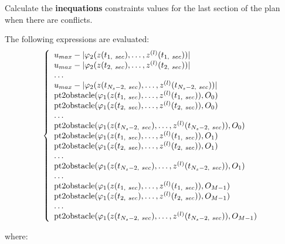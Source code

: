 \documentclass[letterpaper,10pt,english]{sphinxmanual}
\begin{document}
\begin{fulllineitems}
\begin{fulllineitems}
\end{fulllineitems}


\begin{fulllineitems}
\label{Multi-robot motion planner:planning_sim.Robot._ls_co_fieqcons}
Calculate the \textbf{inequations} constraints values for the last section of the plan when
there are conflicts.

The following expressions are evaluated:
\begin{gather}
\begin{split}\left\lbrace\begin{array}{lcl}
u_{max} - |\varphi_2(z(t_{1,\ sec}),\dotsc,z^{(l)}(t_{1,\ sec}))|\\
u_{max} - |\varphi_2(z(t_{2,\ sec}),\dotsc,z^{(l)}(t_{2,\ sec}))|\\
\dotsc\\
u_{max} - |\varphi_2(z(t_{N_s-2,\ sec}),\dotsc,z^{(l)}(t_{N_s-2,\ sec}))|\\
\mathrm{pt2obstacle}(\varphi_1(z(t_{1,\ sec}),\dotsc,z^{(l)}(t_{1,\ sec})), O_0)\\
\mathrm{pt2obstacle}(\varphi_1(z(t_{2,\ sec}),\dotsc,z^{(l)}(t_{2,\ sec})), O_0)\\
\dotsc\\
\mathrm{pt2obstacle}(\varphi_1(z(t_{N_s-2,\ sec}),
\dotsc,z^{(l)}(t_{N_s-2,\ sec})), O_0)\\
\mathrm{pt2obstacle}(\varphi_1(z(t_{1,\ sec}),\dotsc,z^{(l)}(t_{1,\ sec})), O_1)\\
\mathrm{pt2obstacle}(\varphi_1(z(t_{2,\ sec}),\dotsc,z^{(l)}(t_{2,\ sec})), O_1)\\
\dotsc\\
\mathrm{pt2obstacle}(\varphi_1(z(t_{N_s-2,\ sec}),
\dotsc,z^{(l)}(t_{N_s-2,\ sec})), O_1)\\
\dotsc\\
\mathrm{pt2obstacle}(\varphi_1(z(t_{1,\ sec}),
\dotsc,z^{(l)}(t_{1,\ sec})), O_{M-1})\\
\mathrm{pt2obstacle}(\varphi_1(z(t_{2,\ sec}),
\dotsc,z^{(l)}(t_{2,\ sec})), O_{M-1})\\
\dotsc\\
\mathrm{pt2obstacle}(\varphi_1(z(t_{N_s-2,\ sec}),
\dotsc,z^{(l)}(t_{N_s-2,\ sec})), O_{M-1})\\
\end{array}\right.\end{split}\notag
\end{gather}\begin{description}
\item[{where:}] \leavevmode
\begin{tabulary}{\linewidth}{|L|L|}
\hline


\end{tabulary}
\end{description}
\end{fulllineitems}
\end{fulllineitems}
\end{document}
